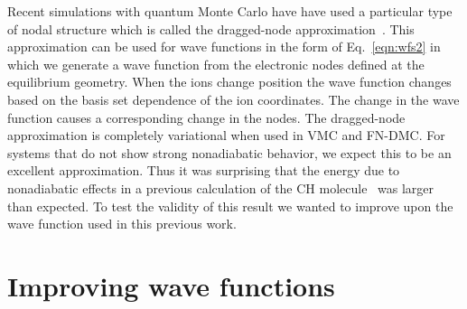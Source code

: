 \documentclass[aip,jcp,numerical,reprint]{revtex4-1}
\begin{document}
Recent simulations with quantum Monte Carlo have have used a particular type of nodal structure which is called the  dragged-node approximation~\cite{Tubman_ECG,Yang2015}.
This approximation can be used for wave functions in the form of Eq.~\eqref{eqn:wfs2} in which  we generate a wave function from the electronic nodes defined at the equilibrium geometry.   When the ions change position the wave function changes based on the basis set dependence of the ion coordinates. The change in the wave function causes a corresponding change in the nodes.  
 The dragged-node approximation is completely variational when used in VMC and FN-DMC.  
For systems that do not show strong nonadiabatic behavior, we expect this to be an excellent approximation. %
 Thus it was surprising that the energy due to nonadiabatic effects in a previous calculation of the CH molecule~\cite{Yang2015} was larger than expected.   To test the validity of this result we wanted to improve upon the wave function used in this previous work.%

\section{Improving wave functions}
\end{document}
